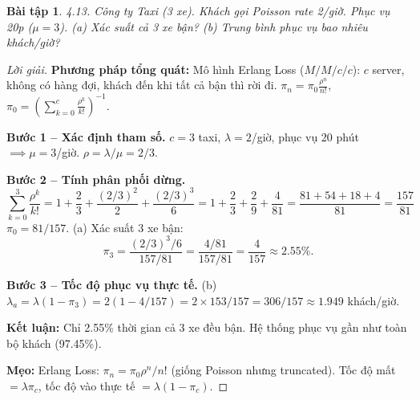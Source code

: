 \documentclass[8pt,a4paper]{article}
\newtheorem{exercise}{Bài tập}
\newenvironment{solution}{\begin{proof}[Lời giải]}{\end{proof}}
\begin{document}
\begin{exercise}
4.13. Công ty Taxi (3 xe). Khách gọi Poisson rate 2/giờ. Phục vụ 20p ($\mu = 3$). 
(a) Xác suất cả 3 xe bận? (b) Trung bình phục vụ bao nhiêu khách/giờ?
\end{exercise}
\begin{solution}
\textbf{Phương pháp tổng quát:} Mô hình Erlang Loss ($M/M/c/c$): $c$ server, không có hàng đợi, khách đến khi tất cả bận thì rời đi. $\pi_n = \pi_0 \frac{\rho^n}{n!}$, $\pi_0 = \left(\sum_{k=0}^c \frac{\rho^k}{k!}\right)^{-1}$.

\textbf{Bước 1 -- Xác định tham số.} $c = 3$ taxi, $\lambda = 2$/giờ, phục vụ 20 phút $\implies \mu = 3$/giờ. $\rho = \lambda/\mu = 2/3$.

\textbf{Bước 2 -- Tính phân phối dừng.}
\[
\sum_{k=0}^3 \frac{\rho^k}{k!} = 1 + \frac{2}{3} + \frac{(2/3)^2}{2} + \frac{(2/3)^3}{6} = 1 + \frac{2}{3} + \frac{2}{9} + \frac{4}{81} = \frac{81+54+18+4}{81} = \frac{157}{81}
\]
$\pi_0 = 81/157$. (a) Xác suất 3 xe bận:
\[
\pi_3 = \frac{(2/3)^3/6}{157/81} = \frac{4/81}{157/81} = \boxed{\frac{4}{157} \approx 2.55\%}.
\]

\textbf{Bước 3 -- Tốc độ phục vụ thực tế.}
(b) $\lambda_a = \lambda(1 - \pi_3) = 2(1 - 4/157) = 2 \times 153/157 = \boxed{306/157 \approx 1.949}$ khách/giờ.

\textbf{Kết luận:} Chỉ 2.55\% thời gian cả 3 xe đều bận. Hệ thống phục vụ gần như toàn bộ khách (97.45\%).

\textbf{Mẹo:} Erlang Loss: $\pi_n = \pi_0 \rho^n/n!$ (giống Poisson nhưng truncated). Tốc độ mất $= \lambda\pi_c$, tốc độ vào thực tế $= \lambda(1-\pi_c)$.
\end{solution}
\end{document}
